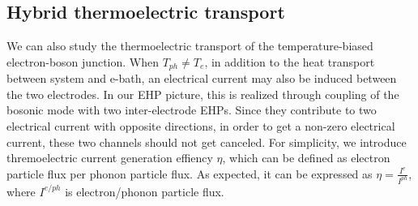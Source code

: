 \documentclass[aps,prb,
,floatfix,footinbib,shortbibliography,
preprint
]{revtex4-1}
\begin{document}



\subsection{Hybrid thermoelectric transport}
 We can also study the thermoelectric transport of the temperature-biased electron-boson junction. When $T_{ph}\neq T_e$, in addition to the heat transport between system and e-bath, an electrical current may also be induced between the two electrodes\cite{entinwuhlman2010three,sanchez2011optimal}. In our EHP picture, this is realized through coupling of the bosonic mode with two inter-electrode EHPs. Since they contribute to two electrical current with opposite directions, in order to get a non-zero electrical current, these two channels should not get canceled. For simplicity, we introduce thremoelectric current generation effiency $\eta$, which can be defined as electron particle flux per phonon particle flux. As expected, it can be expressed as $\eta= \frac{I^e}{I^{ph}}$, where $I^{e/ph}$ is electron/phonon particle flux.
\end{document}
